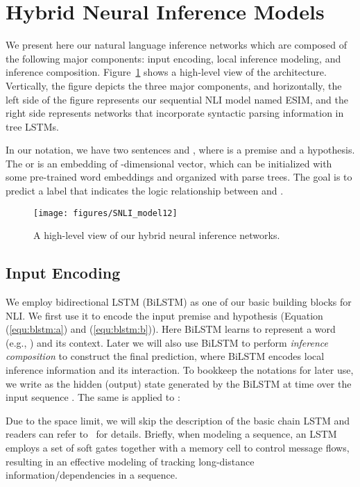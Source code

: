 \documentclass[11pt,a4paper]{article}
\begin{document}
\section{Hybrid Neural Inference Models}

We present here our natural language inference networks which are composed of the following major components: input encoding, local inference modeling, and inference composition. Figure~\ref{fig:snli} shows a high-level view of the architecture. Vertically, the figure depicts the three major components, and horizontally, the left side of the figure represents our sequential NLI model named ESIM, and the right side represents networks that incorporate syntactic parsing information in tree LSTMs.

In our notation, we have two sentences  and , where  is a premise and  a hypothesis. The  or  is an embedding of -dimensional vector, which can be initialized with some pre-trained word embeddings and organized with parse trees. The goal is to predict a label  that indicates the logic relationship between  and .
\begin{figure}[!htb]
	\centering
	\texttt{[image: figures/SNLI\_model12]}
	\caption{A high-level view of our hybrid neural inference networks.}
	\label{fig:snli}
\end{figure}

\subsection{Input Encoding}
We employ bidirectional LSTM (BiLSTM) as one of our basic building blocks for NLI. We first use it to encode the input premise and hypothesis (Equation (\ref{equ:blstm:a}) and (\ref{equ:blstm:b})). Here BiLSTM learns to represent a word (e.g., ) and its context. Later we will also use BiLSTM to perform \textit{inference composition} to construct the final prediction, where BiLSTM encodes local inference information and its interaction. To bookkeep the notations for later use, we write as  the hidden (output) state generated by the BiLSTM at time  over the input sequence . The same is applied to :

{\fontsize{10pt}{1.0cm}
 	
}

Due to the space limit, we will skip the description of the basic chain LSTM and readers can refer to~\citet{DBLP:journals/neco/HochreiterS97} for details. Briefly, when modeling a sequence, an LSTM employs a set of soft gates together with a memory cell to control message flows, resulting in an effective modeling of tracking long-distance information/dependencies in a sequence. 
\end{document}
